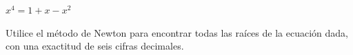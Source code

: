 \item $x^4 = 1 + x - x^2$
\par
Utilice el método de Newton para encontrar todas las raíces de la ecuación dada, con una exactitud de seis cifras decimales.
